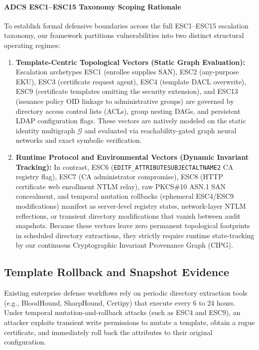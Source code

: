 \paragraph{ADCS ESC1--ESC15 Taxonomy Scoping Rationale}
To establish formal defensive boundaries across the full ESC1--ESC15 escalation taxonomy, our framework partitions vulnerabilities into two distinct structural operating regimes:
\begin{enumerate}
    \item \textbf{Template-Centric Topological Vectors (Static Graph Evaluation):} Escalation archetypes ESC1 (enrollee supplies SAN), ESC2 (any-purpose EKU), ESC3 (certificate request agent), ESC4 (template DACL overwrite), ESC9 (certificate templates omitting the security extension), and ESC13 (issuance policy OID linkage to administrative groups) are governed by directory access control lists (ACLs), group nesting DAGs, and persistent LDAP configuration flags. These vectors are natively modeled on the static identity multigraph $\mathcal{G}$ and evaluated via reachability-gated graph neural networks and exact symbolic verification.
    \item \textbf{Runtime Protocol and Environmental Vectors (Dynamic Invariant Tracking):} In contrast, ESC6 (\texttt{EDITF\_ATTRIBUTESUBJECTALTNAME2} CA registry flag), ESC7 (CA administrator compromise), ESC8 (HTTP certificate web enrollment NTLM relay), raw PKCS\#10 ASN.1 SAN concealment, and temporal mutation rollbacks (ephemeral ESC4/ESC9 modifications) manifest as server-level registry states, network-layer NTLM reflections, or transient directory modifications that vanish between audit snapshots. Because these vectors leave zero permanent topological footprints in scheduled directory extractions, they strictly require runtime state-tracking by our continuous Cryptographic Invariant Provenance Graph (CIPG).
\end{enumerate}

\subsection{Template Rollback and Snapshot Evidence}
Existing enterprise defense workflows rely on periodic directory extraction tools (e.g., BloodHound, SharpHound, Certipy) that execute every 6 to 24 hours. Under temporal mutation-and-rollback attacks (such as ESC4 and ESC9), an attacker exploits transient write permissions to mutate a template, obtain a rogue certificate, and immediately roll back the attributes to their original configuration.

